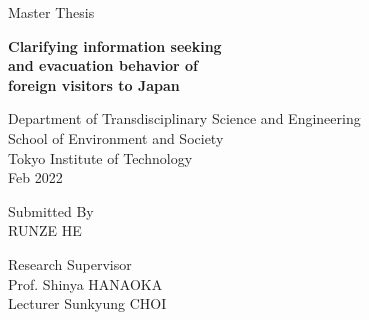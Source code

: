 \pagestyle{empty}

\begin{titlepage}
        \begin{center}
        \vspace*{1.0cm}
        
        \Large
        Master Thesis

        \vspace*{1.0cm}

        \Huge
        {\bf Clarifying information seeking \\and evacuation behavior of \\foreign visitors to Japan }

        \vspace*{3.0cm}

        \normalsize
        Department of Transdisciplinary Science and Engineering\\ 
        School of Environment and Society\\
        Tokyo Institute of Technology\\
        \vspace*{2.0cm}
        \normalsize
        Feb 2022

        \vspace*{2.0cm}

        \normalsize
         Submitted By \\RUNZE HE

        \vspace*{3.0cm}
        \normalsize
        Research Supervisor\\ 
        Prof. Shinya HANAOKA\\
        Lecturer Sunkyung CHOI\\

        \end{center}
\end{titlepage}

\pagestyle{plain}
\setcounter{page}{2}

\cleardoublepage %
